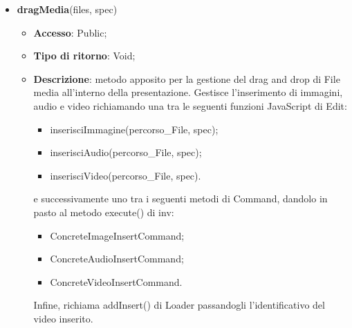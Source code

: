 {{\begin{itemize}
\begin{itemize}
				\item \textbf{Descrizione}: metodo che prima richiama isVideo(frames) di Upload per controllare che le estensioni siano corrette, successivamente uploadmedia(files, callback) di Upload per il caricamento dei File video nel Server. Se l'operazione ha successo, viene invocato callback() il quale inserisce ogni video nel piano della presentazione, attraverso la Funzione\ped{g} JavaScript inserisciVideo(percorso\_File, spec) di Edit, e richiama, utilizzando il metodo execute di inv, ConcreteVideoInsertCommand() di Command passandogli le specifiche degli elementi video inseriti. Infine, richiama addInsert() di Loader passandogli l'identificativo del video inserito. Nel caso in cui il parametro spec sia definito, significa che è stata inviata una richiesta di undo/redo da Command, per cui, il metodo si occuperà solamente di aggiornare la view.
			\end{itemize}
			\item \textbf{dragMedia}(files, spec)
			\begin{itemize}
				\item \textbf{Accesso}: Public;
				\item \textbf{Tipo di ritorno}: Void;
				\item \textbf{Descrizione}: metodo apposito per la gestione del drag and drop di File media all'interno della presentazione. Gestisce l'inserimento di immagini, audio e video richiamando una tra le seguenti funzioni\ped{g} JavaScript di Edit:
				\begin{itemize}
					\item inserisciImmagine(percorso\_File, spec);
					\item inserisciAudio(percorso\_File, spec);
					\item inserisciVideo(percorso\_File, spec).
				\end{itemize}
				 e successivamente uno tra i seguenti metodi di Command, dandolo in pasto al metodo execute() di inv:
				\begin{itemize}
					\item ConcreteImageInsertCommand;
					\item ConcreteAudioInsertCommand;
					\item ConcreteVideoInsertCommand.
				\end{itemize}
				Infine, richiama addInsert() di Loader passandogli l'identificativo del video inserito.
			\end{itemize}

\end{itemize}}}
